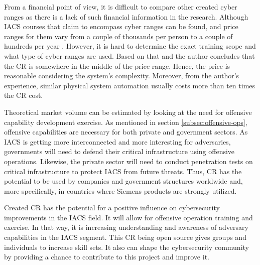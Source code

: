 From a financial point of view, it is difficult to compare other created cyber ranges as there is a lack of such financial information in the research. Although IACS courses that claim to encompass cyber ranges can be found, and price ranges for them vary from a couple of thousands per person \parencite{WEB-25-sans-ics-course} to a couple of hundreds per year \parencite{WEB-26-ditechsolutions-ics-courses}. However, it is hard to determine the exact training scope and what type of cyber ranges are used. Based on that and the author concludes that the CR is somewhere in the middle of the price range. Hence, the price is reasonable considering the system's complexity. Moreover, from the author's experience, similar physical system automation usually costs more than ten times the CR cost.

Theoretical market volume can be estimated by looking at the need for offensive capability development exercise. As mentioned in section \ref{subsec:offensive-ops}, offensive capabilities are necessary for both private and government sectors. As IACS is getting more interconnected and more interesting for adversaries, governments will need to defend their critical infrastructure using offensive operations. Likewise, the private sector will need to conduct penetration tests on critical infrastructure to protect IACS from future threats. Thus, CR has the potential to be used by companies and government structures worldwide and, more specifically, in countries where Siemens products are strongly utilized.

Created CR has the potential for a positive influence on cybersecurity improvements in the IACS field. It will allow for offensive operation training and exercise. In that way, it is increasing understanding and awareness of adversary capabilities in the IACS segment. This CR being open source gives groups and individuals to increase skill sets. It also can shape the cybersecurity community by providing a chance to contribute to this project and improve it. 